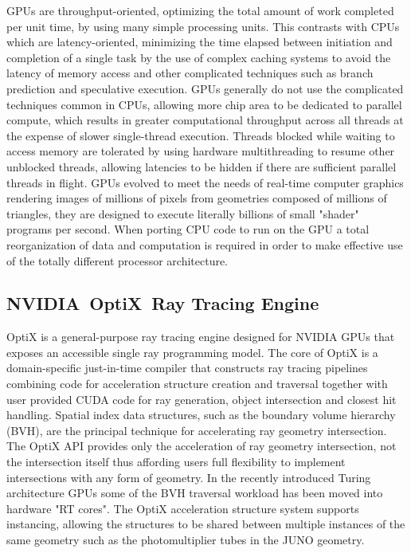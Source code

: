 \documentclass{webofc}
\begin{document}
GPUs are throughput-oriented\cite{throughput}, optimizing the total amount of work completed per unit time,
by using many simple processing units. This contrasts with CPUs which are latency-oriented, 
minimizing the time elapsed between initiation and completion of a single task by the use of complex
caching systems to avoid the latency of memory access and other complicated techniques such as branch prediction 
and speculative execution. GPUs generally do not use the complicated techniques common in CPUs, 
allowing more chip area to be dedicated to parallel compute, which results in greater computational throughput across 
all threads at the expense of slower single-thread execution.
Threads blocked while waiting to access memory are tolerated by using 
hardware multithreading to resume other unblocked threads, allowing latencies to be hidden if
there are sufficient parallel threads in flight. 
GPUs evolved to meet the needs of real-time computer graphics rendering images of millions of pixels from geometries
composed of millions of triangles, they are designed to execute literally billions of small "shader" 
programs per second. When porting CPU code to run on the GPU a total reorganization of 
data and computation is required in order to make effective use of the totally different processor 
architecture.
%
\subsection{NVIDIA\textregistered\ OptiX\texttrademark\ Ray Tracing Engine}
%
OptiX\cite{optixPaper}\cite{optixSite}\cite{optixDocs} is a general-purpose ray tracing engine
designed for NVIDIA GPUs that exposes an accessible single ray programming model.
The core of OptiX is a domain-specific just-in-time compiler that constructs 
ray tracing pipelines combining code for acceleration structure creation and traversal 
together with user provided CUDA code for ray generation, object intersection and closest hit handling.
Spatial index data structures, such as the boundary volume hierarchy (BVH), are the 
principal technique for accelerating ray geometry intersection.  The OptiX API\cite{optixDocs} 
provides only the acceleration of ray geometry intersection, not the intersection itself 
thus affording users full flexibility to implement intersections with any form of geometry. In the recently introduced Turing 
architecture GPUs some of the BVH traversal workload has been moved into hardware "RT cores"\cite{rtx}.
The OptiX acceleration structure system supports instancing, allowing the structures to be shared 
between multiple instances of the same geometry such as the photomultiplier tubes in the JUNO geometry.  
%
\end{document}
